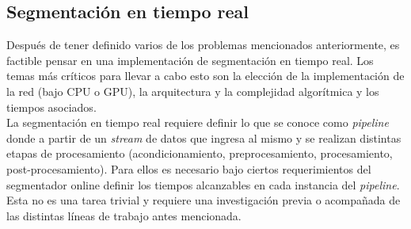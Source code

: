 \subsection*{Segmentación en tiempo real}

\indent Después de tener definido varios de los problemas mencionados anteriormente, es factible pensar en una implementación de segmentación en tiempo real. Los temas más críticos para llevar a cabo esto son la elección de la implementación de la red (bajo CPU o GPU), la arquitectura y la complejidad algorítmica y los tiempos asociados. \\
\indent La segmentación en tiempo real requiere definir lo que se conoce como \textit{pipeline} donde a partir de un \textit{stream} de datos que ingresa al mismo y se realizan distintas etapas de procesamiento (acondicionamiento, preprocesamiento, procesamiento, post-procesamiento). Para ellos es necesario bajo ciertos requerimientos del segmentador online definir los tiempos alcanzables en cada instancia del \textit{pipeline}. Esta no es una tarea trivial y requiere una investigación previa o acompañada de las distintas líneas de trabajo antes mencionada.